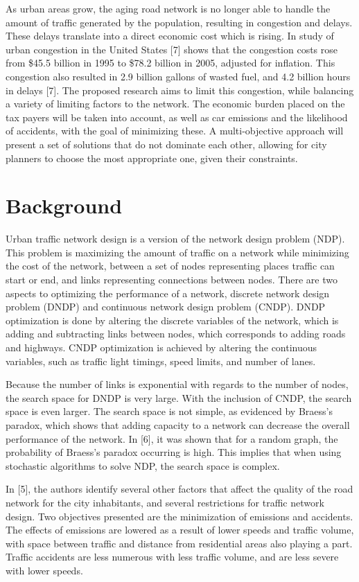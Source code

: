 \documentclass[11pt, oneside, notitlepage, draft]{article}
\begin{document}
    As urban areas grow, the aging road network is no longer able to handle the amount of traffic generated by the population, resulting in congestion and delays. These delays translate into a direct economic cost which is rising. In study of urban congestion in the United States [7] shows that the congestion costs rose from \$45.5 billion in 1995 to \$78.2 billion in 2005, adjusted for inflation. This congestion also resulted in 2.9 billion gallons of wasted fuel, and 4.2 billion hours in delays [7]. The proposed research aims to limit this congestion, while balancing a variety of limiting factors to the network. The economic burden placed on the tax payers will be taken into account, as well as car emissions and the likelihood of accidents,  with the goal of minimizing these. A multi-objective approach will present a set of solutions that do not dominate each other, allowing for city planners to choose the most appropriate one, given their constraints.


\part{Background}
    Urban traffic network design is a version of the network design problem (NDP). This problem is maximizing the amount of traffic on a network while minimizing the cost of the network, between a set of nodes  representing places traffic can start or end, and links representing connections between nodes. There are two aspects to optimizing the performance of a network, discrete network design problem (DNDP) and continuous network design problem (CNDP). DNDP optimization is done by altering the discrete variables of the network, which is adding and subtracting links between nodes, which corresponds to adding roads and highways. CNDP optimization is achieved by altering the continuous variables, such as traffic light timings, speed limits, and number of lanes.

    Because the number of links is exponential with regards to the number of nodes, the search space for DNDP is very large. With the inclusion of CNDP, the search space is even larger. The search space is not simple, as evidenced by Braess's paradox, which shows that adding capacity to a network can decrease the overall performance of the network. In [6], it was shown that for a random graph, the probability of Braess's paradox occurring is high. This implies that when using stochastic algorithms to solve NDP, the search space is complex.

    In [5], the authors identify several other factors that affect the quality of the road network for the city inhabitants, and several restrictions for traffic network design. Two objectives presented are the minimization of emissions and accidents. The effects of emissions are lowered as a result of lower speeds and traffic volume, with space between traffic and distance from residential areas also playing a part. Traffic accidents are less numerous with less traffic volume, and are less severe with lower speeds.
\end{document}
